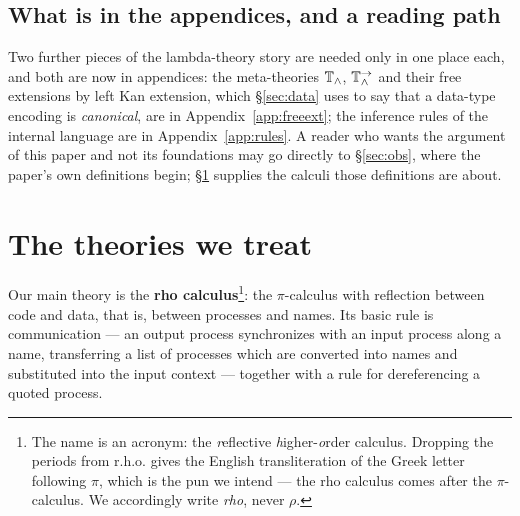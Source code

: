 \documentclass{article}
\begin{document}
\subsection{What is in the appendices, and a reading path}
\label{sec:meta}

Two further pieces of the lambda-theory story are needed only in one place each, and both are now in appendices: the meta-theories $\mathbb{T}_\land$, $\mathbb{T}_\land^\to$ and their free extensions by left Kan extension, which \S\ref{sec:data} uses to say that a data-type encoding is \emph{canonical}, are in Appendix~\ref{app:freeext}; the inference rules of the internal language are in Appendix~\ref{app:rules}. A reader who wants the argument of this paper and not its foundations may go directly to \S\ref{sec:obs}, where the paper's own definitions begin; \S\ref{sec:cat} supplies the calculi those definitions are about.

\section{The theories we treat}
\label{sec:cat}

Our main theory is the \textbf{rho calculus}\footnote{The name is an acronym: the \emph{r}eflective \emph{h}igher-\emph{o}rder calculus. Dropping the periods from r.h.o. gives the English transliteration of the Greek letter following $\pi$, which is the pun we intend --- the rho calculus comes after the $\pi$-calculus. We accordingly write \emph{rho}, never $\rho$.}: the $\pi$-calculus with reflection between code and data, that is, between processes and names. Its basic rule is communication --- an output process synchronizes with an input process along a name, transferring a list of processes which are converted into names and substituted into the input context --- together with a rule for dereferencing a quoted process.
\end{document}
